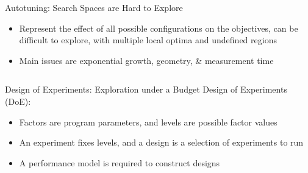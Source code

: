 \documentclass[11pt, compress, aspectratio=169, xcolor={table,usenames,dvipsnames}]{beamer}
\begin{document}
\begin{frame}
\begin{columns}
\begin{column}{0.86\columnwidth}
\begin{columns}
\begin{column}[t]{0.5\columnwidth}
\begin{block}{Autotuning: Search Spaces are Hard to Explore}
\begin{itemize}
\item Represent the \alert{effect} of all possible
\alert{configurations} on the \alert{objectives}, can be difficult to explore,
with multiple \alert{local optima} and \alert{undefined regions}
\item \alert{Main issues} are \alert{exponential growth}, \alert{geometry}, \& \alert{measurement time}
\end{itemize}
\end{block}
\end{column}
\end{columns}
\begin{columns}
\begin{column}[t]{0.5\columnwidth}
\begin{block}{Design of Experiments: Exploration under a Budget}
\alert{Design of Experiments} (\alert{DoE}):
\vspace{1em}
\begin{itemize}
\item \alert{Factors} are program \alert{parameters},
and \alert{levels} are possible factor \alert{values}
\item An \alert{experiment} fixes levels,
and a \alert{design} is a \alert{selection} of experiments to \alert{run}
\item A \alert{performance model} is required to \alert{construct designs}
\end{itemize}


\end{block}
\end{column}
\end{columns}
\end{column}
\end{columns}
\end{frame}
\end{document}
